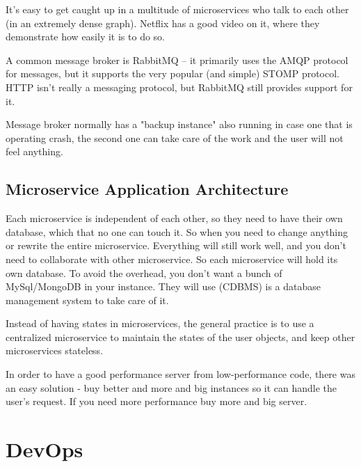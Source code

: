 \documentclass[fancy,11pt,titlestyle=display]{style/elegantbook}
\begin{document}
\par It's easy to get caught up in a multitude of microservices who talk to each other (in an extremely dense graph). Netflix has a good video on it, where they demonstrate how easily it is to do so.

\par A common message broker is RabbitMQ -- it primarily uses the AMQP protocol for messages, but it supports the very popular (and simple) STOMP protocol. HTTP isn't really a messaging protocol, but RabbitMQ still provides support for it.


\par Message broker normally has a "backup instance" also running in case one that is operating crash, the second one can take care of the work and the user will not feel anything. 

\section{Microservice Application Architecture}
\par Each microservice is independent of each other, so they need to have their own database, which that no one can touch it.
So when you need to change anything or rewrite the entire microservice. Everything will still work well, and you don't need to collaborate with other microservice. So each microservice will hold its own database. To avoid the overhead, you don't want a bunch of MySql/MongoDB in your instance. They will use  (CDBMS) is a database management system to take care of it.

\par Instead of having states in microservices, the general practice is to use a centralized microservice to maintain the states of the user objects, and keep other microservices stateless. 

\par In order to have a good performance server from low-performance code, there was an easy solution - buy better and more and big instances so it can handle the user's request. If you need more performance buy more and big server. 

\chapter{DevOps}

\end{document}
